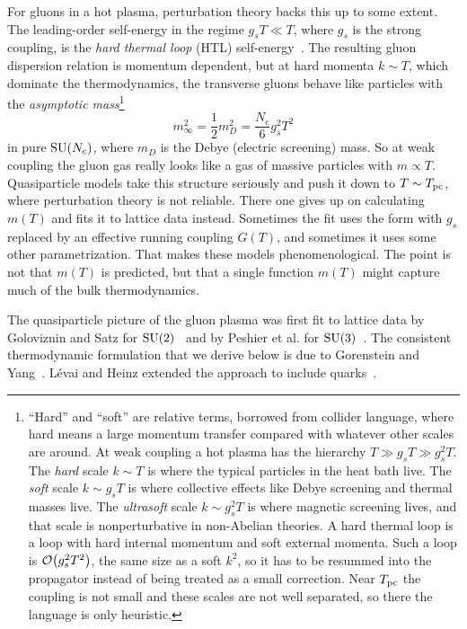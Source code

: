 For gluons in a hot plasma, perturbation theory backs this up to some extent.
The leading-order self-energy in the regime $g_sT\ll T$, where $g_s$ is
the strong coupling, is the {\it hard thermal loop}
(HTL) self-energy~\cite{braaten_soft_1990}.
The resulting gluon dispersion relation is momentum dependent, but at hard
momenta $k\sim T$, which dominate the thermodynamics, the transverse gluons
behave like particles with the {\it asymptotic mass}\footnote{``Hard''
and ``soft'' are relative terms, borrowed from collider language, where hard means a large
momentum transfer compared with whatever other scales are around. At weak coupling a hot
plasma has the hierarchy $T\gg g_sT\gg g_s^2T$. The {\it hard} scale $k\sim T$ is where the
typical particles in the heat bath live. The {\it soft} scale $k\sim g_sT$ is
where collective effects like Debye screening and thermal masses live. The {\it ultrasoft}
scale $k\sim g_s^2T$ is where magnetic screening lives, and that scale is nonperturbative in
non-Abelian theories. A hard thermal loop is a loop with hard internal momentum and soft
external momenta. Such a loop is $\order{g_s^2T^2}$, the same size as a soft $k^2$, so it has to be
resummed into the propagator instead of being treated as a small correction. Near $T_{\rm pc}$ the coupling
is not small and these scales are not well separated, so there the language is only
heuristic.}
\begin{equation}\label{eq:asymptoticmass}
  m_\infty^2=\frac{1}{2}m_D^2=\frac{N_c}{6}g_s^2T^2
\end{equation}
in pure $\operatorname{SU}(N_c)$, where $m_D$ is the Debye (electric screening) mass.
So at weak coupling the gluon gas really looks like a gas of massive
particles with $m\propto T$. Quasiparticle models take this structure seriously
and push it down to $T\sim T_{\rm pc}$, where perturbation theory is not reliable.
There one gives up on calculating $m(T)$ and fits it to lattice data
instead. Sometimes the fit uses the form 
with $g_s$ replaced by an effective running coupling $G(T)$, and sometimes
it uses some other parametrization. That makes these models
phenomenological. The point is not that $m(T)$ is predicted, but that a
single function $m(T)$ might capture much of the bulk thermodynamics.

The quasiparticle picture of the gluon plasma was first fit to lattice
data by Goloviznin and Satz for $\operatorname{SU}(2)$~\cite{goloviznin_refractive_1993}
and by Peshier et al. for $\operatorname{SU}(3)$~\cite{peshier_massive_1996}.
The consistent thermodynamic formulation that we derive below is due to
Gorenstein and Yang~\cite{gorenstein_gluon_1995}. Lévai and Heinz
extended the approach to include quarks~\cite{levai_massive_1998}.

